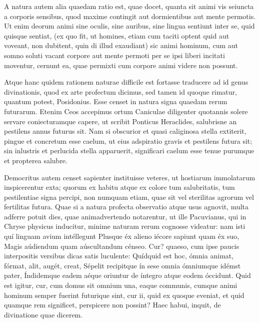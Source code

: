  A natura autem alia quaedam ratio est, quae docet, quanta sit animi vis seiuncta a corporis sensibus, quod maxime contingit aut dormientibus aut mente permotis. Ut enim deorum animi sine oculis, sine auribus, sine lingua sentiunt inter se, quid quisque sentiat, (ex quo fit, ut homines, etiam cum taciti optent quid aut voveant, non dubitent, quin di illud exaudiant) sic animi hominum, cum aut somno soluti vacant corpore aut mente permoti per se ipsi liberi incitati moventur, cernunt ea, quae permixti cum corpore animi videre non possunt.

 Atque hanc quidem rationem naturae difficile est fortasse traducere ad id genus divinationis, quod ex arte profectum dicimus, sed tamen id quoque rimatur, quantum potest, Posidonius. Esse censet in natura signa quaedam rerum futurarum. Etenim Ceos accepimus ortum Caniculae diligenter quotannis solere servare coniecturamque capere, ut scribit Ponticus Heraclides, salubrisne an pestilens annus futurus sit. Nam si obscurior et quasi caliginosa stella extiterit, pingue et concretum esse caelum, ut eius adspiratio gravis et pestilens futura sit; sin inlustris et perlucida stella apparuerit, significari caelum esse tenue purumque et propterea salubre.

 Democritus autem censet sapienter instituisse veteres, ut hostiarum immolatarum inspicerentur exta; quorum ex habitu atque ex colore tum salubritatis, tum pestilentiae signa percipi, non numquam etiam, quae sit vel sterilitas agrorum vel fertilitas futura. Quae si a natura profecta observatio atque usus agnovit, multa adferre potuit dies, quae animadvertendo notarentur, ut ille Pacuvianus, qui in Chryse physicus inducitur, minime naturam rerum cognosse videatur: nam isti quí linguam avium intéllegunt Plusque éx alieno iécore sapiunt quam éx suo, Magis aúdiendum quam aúscultandum cénseo. Cur? quaeso, cum ipse paucis interpositis versibus dicas satis luculente: Quídquid est hoc, ómnia animat, fórmat, alit, augét, creat, Sépelit recipitque ín sese omnia ómniumque idémst pater, Índidemque eadem aéque oriuntur de íntegro atque eodem óccidunt. Quid est igitur, cur, cum domus sit omnium una, eaque communis, cumque animi hominum semper fuerint futurique sint, cur ii, quid ex quoque eveniat, et quid quamque rem significet, perspicere non possint? Haec habui, inquit, de divinatione quae dicerem.

